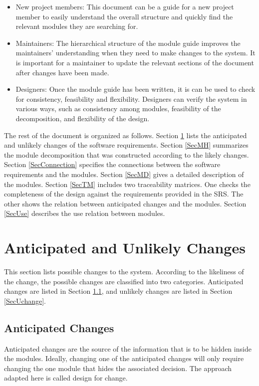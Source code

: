 \documentclass[12pt]{article}
\begin{document}
\begin{itemize}
\item New project members: This document can be a guide for a new project member
  to easily understand the overall structure and quickly find the
  relevant modules they are searching for.
\item Maintainers: The hierarchical structure of the module guide improves the
  maintainers' understanding when they need to make changes to the system. It is
  important for a maintainer to update the relevant sections of the document
  after changes have been made.
\item Designers: Once the module guide has been written, it is can be used to
  check for consistency, feasibility and flexibility. Designers can verify the
  system in various ways, such as consistency among modules, feasibility of the
  decomposition, and flexibility of the design.
\end{itemize}

The rest of the document is organized as follows. Section
\ref{SecChange} lists the anticipated and unlikely changes of the software
requirements. Section \ref{SecMH} summarizes the module decomposition that
was constructed according to the likely changes. Section \ref{SecConnection}
specifies the connections between the software requirements and the
modules. Section \ref{SecMD} gives a detailed description of the
modules. Section \ref{SecTM} includes two traceability matrices. One checks
the completeness of the design against the requirements provided in the SRS. The
other shows the relation between anticipated changes and the modules. Section
\ref{SecUse} describes the use relation between modules.

\section{Anticipated and Unlikely Changes} \label{SecChange}

This section lists possible changes to the system. According to the likeliness
of the change, the possible changes are classified into two
categories. Anticipated changes are listed in Section \ref{SecAchange}, and
unlikely changes are listed in Section \ref{SecUchange}.

\subsection{Anticipated Changes} \label{SecAchange}

Anticipated changes are the source of the information that is to be hidden
inside the modules. Ideally, changing one of the anticipated changes will only
require changing the one module that hides the associated decision. The approach
adapted here is called design for
change. %
\end{document}
